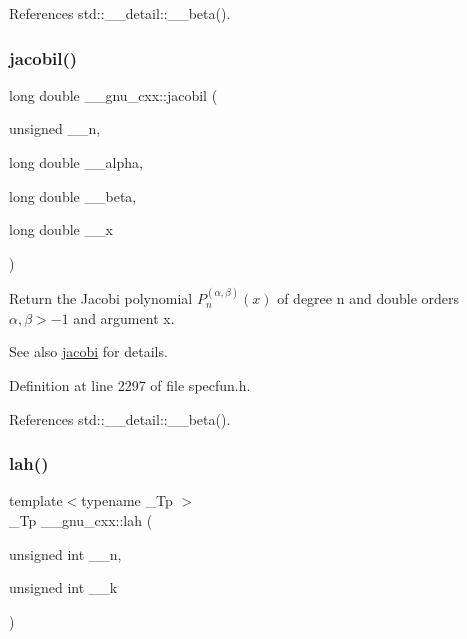 References std\+::\+\_\+\+\_\+detail\+::\+\_\+\+\_\+beta().

\mbox{\label{group__mathsf__gnu_ga2898a5ebf451eaf259ecfcdd171aa72b}} 
\subsubsection{\texorpdfstring{jacobil()}{jacobil()}}
{\footnotesize\ttfamily long double \+\_\+\+\_\+gnu\+\_\+cxx\+::jacobil (\begin{DoxyParamCaption}\item[{unsigned}]{\+\_\+\+\_\+n,  }\item[{long double}]{\+\_\+\+\_\+alpha,  }\item[{long double}]{\+\_\+\+\_\+beta,  }\item[{long double}]{\+\_\+\+\_\+x }\end{DoxyParamCaption})\hspace{0.3cm}{\ttfamily [inline]}}

Return the Jacobi polynomial $ P_n^{(\alpha,\beta)}(x) $ of degree {\ttfamily n} and { double} orders $ \alpha, \beta > -1 $ and argument {\ttfamily x}.

\begin{DoxySeeAlso}{See also}
\hyperlink{group__mathsf__gnu_gad54f6601748324d268532138eb38ca33}{jacobi} for details. 
\end{DoxySeeAlso}


Definition at line 2297 of file specfun.\+h.



References std\+::\+\_\+\+\_\+detail\+::\+\_\+\+\_\+beta().

\mbox{\label{group__mathsf__gnu_gaa3491fabb0a6ef54a946a7a23ca866c7}} 
\subsubsection{\texorpdfstring{lah()}{lah()}\hspace{0.1cm}{\footnotesize\ttfamily [1/2]}}
{\footnotesize\ttfamily template$<$typename \+\_\+\+Tp $>$ \\
\+\_\+\+Tp \+\_\+\+\_\+gnu\+\_\+cxx\+::lah (\begin{DoxyParamCaption}\item[{unsigned int}]{\+\_\+\+\_\+n,  }\item[{unsigned int}]{\+\_\+\+\_\+k }\end{DoxyParamCaption})\hspace{0.3cm}{\ttfamily [inline]}}

